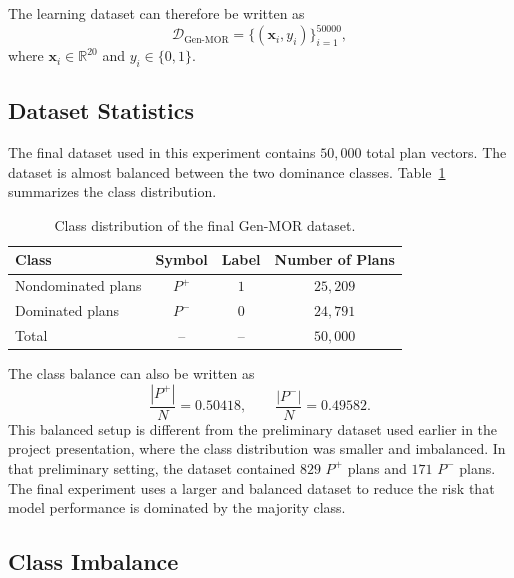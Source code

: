 The learning dataset can therefore be written as
\begin{equation}
    \mathcal{D}_{\text{Gen-MOR}}
    =
    \{(\mathbf{x}_i, y_i)\}_{i=1}^{50000},
    \label{eq:final_genmor_dataset}
\end{equation}
where $\mathbf{x}_i \in \mathbb{R}^{20}$ and $y_i \in \{0,1\}$.

\subsection{Dataset Statistics}
\label{subsec:dataset_statistics}

The final dataset used in this experiment contains $50{,}000$ total plan vectors. The dataset is almost balanced between the two dominance classes. Table~\ref{tab:dataset_statistics} summarizes the class distribution.

\begin{table}[H]
\centering
\caption{Class distribution of the final Gen-MOR dataset.}
\label{tab:dataset_statistics}
\begin{tabular}{|l|c|c|c|}
\hline
\textbf{Class} & \textbf{Symbol} & \textbf{Label} & \textbf{Number of Plans} \\
\hline
Nondominated plans & $P^{+}$ & $1$ & $25{,}209$ \\
Dominated plans & $P^{-}$ & $0$ & $24{,}791$ \\
\hline
Total & -- & -- & $50{,}000$ \\
\hline
\end{tabular}
\end{table}

The class balance can also be written as
\begin{equation}
    \frac{|P^{+}|}{N} = 0.50418,
    \qquad
    \frac{|P^{-}|}{N} = 0.49582.
    \label{eq:class_balance}
\end{equation}
This balanced setup is different from the preliminary dataset used earlier in the project presentation, where the class distribution was smaller and imbalanced. In that preliminary setting, the dataset contained $829$ $P^{+}$ plans and $171$ $P^{-}$ plans. The final experiment uses a larger and balanced dataset to reduce the risk that model performance is dominated by the majority class.

\subsection{Class Imbalance}
\label{subsec:class_imbalance}

